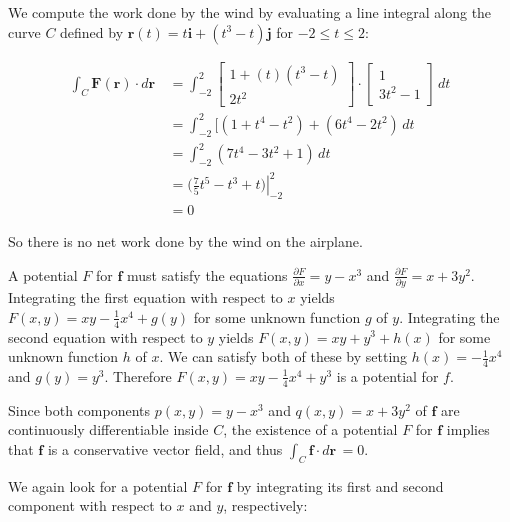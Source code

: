 \item We compute the work done by the wind by evaluating a line integral along
the curve $C$ defined by $\mathbf{r}(t) = t\mathbf{i} + (t^3 - t)\mathbf{j}$
for $-2 \leq t \leq 2$:

\begin{align*}
 \int_C \! \mathbf{F}(\mathbf{r}) \cdot d\mathbf{r} \,
 &= \int_{-2}^{2} \! \begin{bmatrix}
                      1 + (t)(t^3 - t) \\
                      2t^2
                     \end{bmatrix} \cdot
                     \begin{bmatrix}
                      1 \\
                      3t^2 - 1
                     \end{bmatrix} \, dt \\
 &= \int_{-2}^{2} \! [(1 + t^4 - t^2) + (6t^4 - 2t^2) \, dt \\
 &= \int_{-2}^{2} \! (7t^4 - 3t^2 + 1) \, dt \\
 &= (\left. \frac{7}{5}t^5 - t^3 + t) \right|_{-2}^{2} \\
 &= 0
\end{align*}

So there is no net work done by the wind on the airplane.

\item
\BEN
\item

A potential $F$ for $\mathbf{f}$ must satisfy the equations $\frac{\partial
F}{\partial x} = y - x^3$ and $\frac{\partial F}{\partial y} = x + 3y^2$.
Integrating the first equation with respect to $x$ yields $F(x,y) = xy -
\frac{1}{4}x^4 + g(y)$ for some unknown function $g$ of $y$.  Integrating the
second equation with respect to $y$ yields $F(x,y) = xy + y^3 + h(x)$ for some
unknown function $h$ of $x$.  We can satisfy both of these by setting $h(x) =
-\frac{1}{4}x^4$ and $g(y) = y^3$.  Therefore $F(x,y) = xy - \frac{1}{4}x^4 +
y^3$ is a potential for $f$.

Since both components $p(x,y) = y - x^3$ and $q(x,y) = x + 3y^2$ of
$\mathbf{f}$ are continuously differentiable inside $C$, the existence of a
potential $F$ for $\mathbf{f}$ implies that $\mathbf{f}$ is a conservative
vector field, and thus $\int_C \! \mathbf{f} \cdot d\mathbf{r} \, = 0$.

\item

We again look for a potential $F$ for $\mathbf{f}$ by integrating its first and
second component with respect to $x$ and $y$, respectively:


